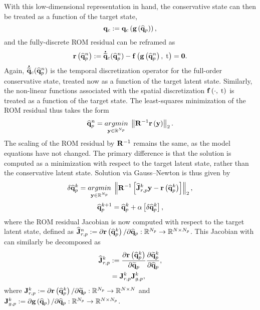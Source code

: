 With this low-dimensional representation in hand, the conservative state can then be treated as a function of the target state,
%
\begin{equation}\label{eq:consFuncTarget}
    \mathbf{q}_{c} := \mathbf{q}_{c} \left(\mathbf{g} \left(\mathbf{\widehat{q}}_{p}\right)\right),
\end{equation}
%
and the fully-discrete ROM residual can be reframed as
%
\begin{equation}
    \mathbf{r}\left(\mathbf{\widehat{q}}_{p}^{n}\right) := \accentset{\mbox{\large\bfseries .}}{\mathbf{\widetilde{q}}}_{c}(\mathbf{\widehat{q}}_{p}^{n}) - \mathbf{f} \left(\mathbf{g} \left(\mathbf{\widehat{q}}_{p}^{n}\right), \; \text{t}\right) = \mathbf{0}.
\end{equation}
%
Again, $\accentset{\mbox{\large\bfseries .}}{\mathbf{\widetilde{q}}}_{c}(\mathbf{\widehat{q}}_{p}^{n})$ is the temporal discretization operator for the full-order conservative state, treated now as a function of the target latent state. Similarly, the non-linear functions associated with the spatial discretization $ \mathbf{f} \left(\cdot, \; \text{t}\right)$ is treated as a function of the target state. The least-squares minimization of the ROM residual thus takes the form
%
\begin{equation}\label{eq:mplsvtLS}
    \primVecCoef^{\timeIdx} = \argmin{\dummyVec \inROne{\numPrimModes}} \left\Vert \resScaleInv \resFunc{\dummyVec} \right\Vert_2.
\end{equation}
%
The scaling of the ROM residual by $\resScaleInv$ remains the same, as the model equations have not changed. The primary difference is that the solution is computed as a minimization with respect to the target latent state, rather than the conservative latent state. Solution via Gauss--Newton is thus given by
%
\begin{equation}\label{eq:mplsvtLSLin}
    \delta \primVecCoef^{\newtonIdx} = \argmin{\dummyVec \inROne{\numPrimModes}} \left\Vert \resScaleInv \left[\jacobResCoefPrim^{\newtonIdx} \dummyVec - \resFunc{\primVecCoef^{\newtonIdx}}\right] \right\Vert_2,
\end{equation}
\begin{equation}
    \mathbf{\widehat{q}}_{p}^{k + 1} = \mathbf{\widehat{q}}_{p}^{k} + \alpha \left[ \delta \mathbf{\widehat{q}}_{p}^{k} \right],
\end{equation}
%
where the ROM residual Jacobian is now computed with respect to the target latent state, defined as $\mathbf{\widehat{J}}_{r,p}^{n} := \partial \mathbf{r}\left(\mathbf{\widehat{q}}_{p}^{k}\right) / \partial \mathbf{\widehat{q}}_{p}: \mathbb{R}^{N_p} \rightarrow \mathbb{R}^{N \times N_p}$. This Jacobian with can similarly be decomposed as
%
\begin{align}
    \mathbf{\widehat{J}}_{r,p}^{k} &:= \frac{\partial \mathbf{r}\left(\mathbf{\widehat{q}}_{p}^{k}\right)}{\partial \mathbf{\widetilde{q}}_{p}} \frac{\partial \mathbf{\widetilde{q}}_{p}^{k}}{\partial \mathbf{\widehat{q}}_{p}}, \\
    &= \mathbf{J}_{r,p}^{k} \mathbf{J}_{g,p}^{k},
\end{align}
%
where $\mathbf{J}_{r,p}^{k} := \partial \mathbf{r}\left(\mathbf{\widehat{q}}_{p}^{k}\right) / \partial \mathbf{\widetilde{q}}_{p}: \mathbb{R}^{N_p} \rightarrow \mathbb{R}^{N \times N}$ and $\mathbf{J}_{g,p}^{k} := \partial \mathbf{g} \left(\mathbf{\widehat{q}}_{p}\right) / \partial \mathbf{\widehat{q}}_{p}: \mathbb{R}^{N_p} \rightarrow \mathbb{R}^{N \times N_p}$.

